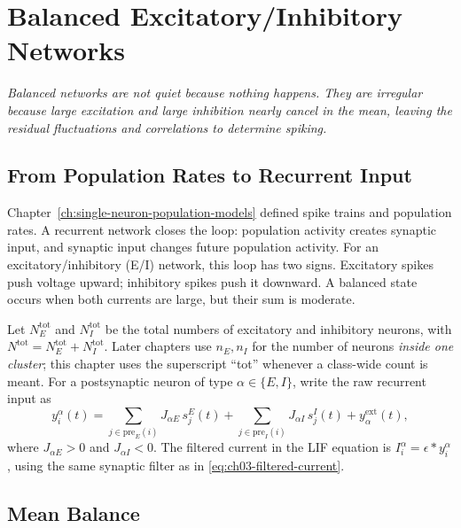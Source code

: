 \chapter{Balanced Excitatory/Inhibitory Networks}
\label{ch:balanced-ei-networks}

\textit{Balanced networks are not quiet because nothing happens. They are
irregular because large excitation and large inhibition nearly cancel in the
mean, leaving the residual fluctuations and correlations to determine spiking.}

\section{From Population Rates to Recurrent Input}
\label{sec:from-rates-to-input}

Chapter~\ref{ch:single-neuron-population-models} defined spike trains and
population rates. A recurrent network closes the loop: population activity
creates synaptic input, and synaptic input changes future population activity.
For an excitatory/inhibitory (E/I) network, this loop has two signs. Excitatory
spikes push voltage upward; inhibitory spikes push it downward. A balanced
state occurs when both currents are large, but their sum is moderate.

Let $N_E^{\mathrm{tot}}$ and $N_I^{\mathrm{tot}}$ be the total numbers of
excitatory and inhibitory neurons, with
$N^{\mathrm{tot}}=N_E^{\mathrm{tot}}+N_I^{\mathrm{tot}}$. Later chapters use
$n_E,n_I$ for the number of neurons \emph{inside one cluster}; this chapter uses
the superscript ``tot'' whenever a class-wide count is meant. For a postsynaptic
neuron of type $\alpha\in\{E,I\}$, write the raw recurrent input as
%
\begin{equation}
  y_i^\alpha(t)
  =
  \sum_{j\in \mathrm{pre}_E(i)} J_{\alpha E}\,s_j^E(t)
  +
  \sum_{j\in \mathrm{pre}_I(i)} J_{\alpha I}\,s_j^I(t)
  + y_{\alpha}^{\mathrm{ext}}(t),
  \label{eq:ch04-ei-raw-input}
\end{equation}
%
where $J_{\alpha E}>0$ and $J_{\alpha I}<0$. The filtered current in the LIF
equation is $I_i^\alpha=\epsilon*y_i^\alpha$, using the same synaptic filter
as in \cref{eq:ch03-filtered-current}.

\section{Mean Balance}
\label{sec:mean-balance}

